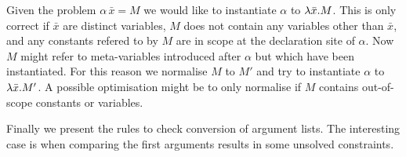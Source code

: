 
Given the problem $\alpha \, \bar x = M$ we would like to instantiate $\alpha$ to
$\lambda \bar x.{} M$. This is only correct if $\bar x$ are distinct variables, $M$
does not contain any variables other than $\bar x$, and any constants refered
to by $M$ are in scope at the declaration site of $\alpha$. Now $M$ might refer
to meta-variables introduced after $\alpha$ but which have been instantiated.
For this reason we normalise $M$ to $M'$ and try to instantiate $\alpha$ to
$\lambda \bar x.{} M'$. A possible optimisation might be to only normalise if $M$
contains out-of-scope constants or variables.

Finally we present the rules to check conversion of argument lists. The
interesting case is when comparing the first arguments results in some unsolved
constraints.


